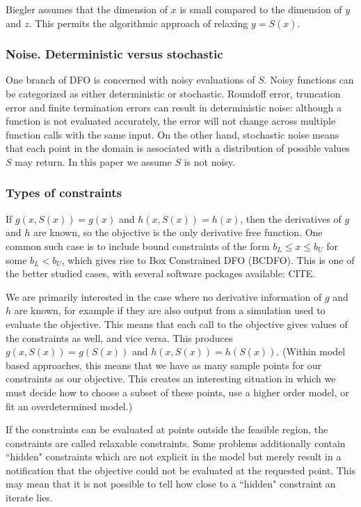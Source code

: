 \documentclass{article}
\begin{document}
Biegler assumes that the dimension of $x$ is small compared to the dimension of $y$ and $z$.
This permits the algorithmic approach of relaxing $y=S(x)$.

\underline{\hspace{8cm}}

\subsubsection{Noise. Deterministic versus stochastic}

One branch of DFO is concerned with noisy evaluations of $S$.
Noisy functions can be categorized as either deterministic or stochastic.
Roundoff error, truncation error and finite termination errors can result in deterministic noise: although a function is not evaluated accurately, the error will not change across multiple function calls with the same input.
On the other hand, stochastic noise means that each point in the domain is associated with a distribution of possible values $S$ may return.
In this paper we assume $S$ is not noisy.

\subsubsection{Types of constraints}


If $g(x, S(x)) = g(x)$ and $h(x, S(x)) = h(x)$, then the derivatives of $g$ and $h$ are known, so the objective is the only derivative free function.
One common such case is to include bound constraints of the form $b_{L} \le x \le b_{U}$ for some $b_{L} < b_{U}$, which gives rise to Box Constrained DFO (BCDFO).
This is one of the better studied cases, with several software packages available: CITE.


We are primarily interested in the case where no derivative information of $g$ and $h$ are known, for example if they are also output from a simulation used to evaluate the objective.
This means that each call to the objective gives values of the constraints as well, and vice versa.
This produces $g(x, S(x))=g(S(x))$ and $h(x,S(x))=h(S(x))$.
(Within model based approaches, this means that we have as many sample points for our constraints as our objective.
This creates an interesting situation in which we must decide how to choose a subset of these points, use a higher order model, or fit an overdetermined model.)


If the constraints can be evaluated at points outside the feasible region, the constraints are called relaxable constraints.
Some problems additionally contain ``hidden" constraints which are not explicit in the model but merely result in a notification that the objective could not be evaluated at the requested point.
This may mean that it is not possible to tell how close to a ``hidden" constraint an iterate lies.
\end{document}
